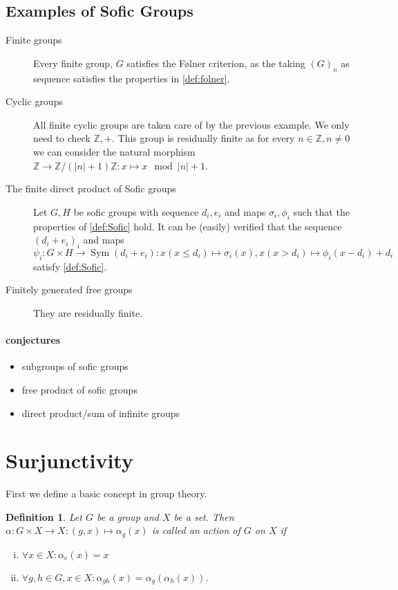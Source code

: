\documentclass[titlepage, a4paper]{article}
\newcommand{\Z}{\mathbb{Z}}
\DeclareMathOperator{\sym}{Sym}
\newtheorem{definition}{Definition}
\theoremstyle{remark}
\begin{document}
    \subsection{Examples of Sofic Groups}
    \begin{description}
        \item[Finite groups] Every finite group, $G$ satisfies the Følner criterion, as the taking $(G)_n$ as sequence satisfies the properties in \cref{def:folner}.
        \item[Cyclic groups] All finite cyclic groups are taken care of by the previous example. We only need to check $\Z,+$. This group is residually finite as for every $n \in \Z, n \ne 0$ we can consider the natural morphism $\Z \to \Z /(|n|+1)\Z: x \mapsto x \mod |n|+1$. 
        \item[The finite direct product of Sofic groups] Let $G, H$ be sofic groups with sequence $d_i, e_i$ and maps $\sigma_i, \phi_i$ such that the properties of \cref{def:Sofic} hold. It can be (easily) verified that the sequence $(d_i + e_i)_i$ and maps $\psi_i: G \times H \to \sym(d_i + e_i): x (x \le d_i) \mapsto \sigma_i(x), x (x > d_i) \mapsto \phi_i(x -d_i) + d_i$ satisfy \cref{def:Sofic}.
        \item[Finitely generated free groups] They are residually finite.
    \end{description}
    \paragraph{conjectures}
    \begin{itemize}
        \item subgroups of sofic groups
        \item free product of sofic groups
        \item direct product/sum of infinite groups
    \end{itemize}

 

    \section{Surjunctivity}

    First we define a basic concept in group theory.

    \begin{definition} %
        Let $G$ be a group and $X$ be a set. Then $\alpha: G \times X \to X: (g,x) \mapsto \alpha_g(x)$ is called an action of $G$ on $X$ if
        \begin{enumerate}[(i)]
            \item $\forall x \in X: \alpha_e(x) = x$
            \item $\forall g,h \in G, x\in X: \alpha_{gh}(x) = \alpha_g(\alpha_h(x))$.
        \end{enumerate}
    \end{definition}
\end{document}
